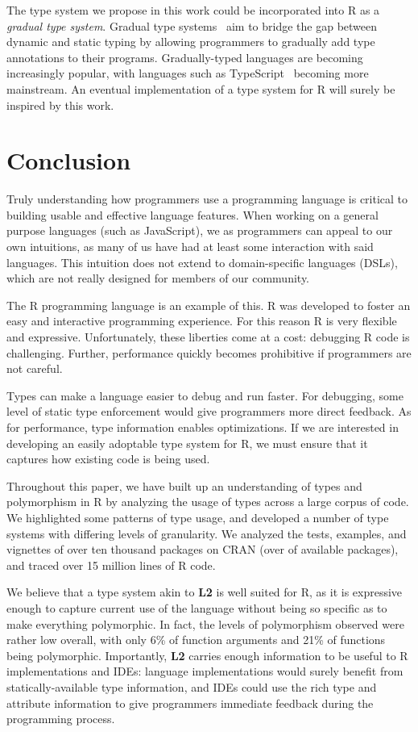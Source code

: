 \documentclass[acmsmall,10pt,review,anonymous]{acmart}\settopmatter{printfolios=true,printccs=false,printacmref=false}
\begin{document}
The type system we propose in this work could be incorporated into R as a {\it gradual type system}.
Gradual type systems~\cite{SiekTaha06} aim to bridge the gap between dynamic and static typing by allowing programmers to gradually add type annotations to their programs.
Gradually-typed languages are becoming increasingly popular, with languages such as TypeScript~\cite{typescript13} becoming more mainstream.
An eventual implementation of a type system for R will surely be inspired by this work.

%
%
%
%
%
\section{Conclusion}

Truly understanding how programmers use a programming language is critical
to building usable and effective language features.  When working on a
general purpose languages (such as JavaScript), we as programmers can appeal
to our own intuitions, as many of us have had at least some interaction with
said languages.  This intuition does not extend to domain-specific languages
(DSLs), which are not really designed for members of our community.  

The R programming language is an example of this.  R was developed to foster
an easy and interactive programming experience. For this reason R is very
flexible and expressive.  Unfortunately, these liberties come at a cost:
debugging R code is challenging. Further, performance quickly becomes
prohibitive if programmers are not careful.

Types can make a language easier to debug and run faster.  For debugging,
some level of static type enforcement would give programmers more direct
feedback.  As for performance, type information enables optimizations. If we
are interested in developing an easily adoptable type system for R, we must
ensure that it captures how existing code is being used.  

Throughout this paper, we have built up an understanding of types and
polymorphism in R by analyzing the usage of types across a large corpus of
code.  We highlighted some patterns of type usage, and developed a number of
type systems with differing levels of granularity. We analyzed the tests,
examples, and vignettes of over ten thousand packages on CRAN (over
\PERCENTCRAN of available packages), and traced over 15 million lines of R
code.

We believe that a type system akin to {\bf L2} is well suited for R, as it
is expressive enough to capture current use of the language without being so
specific as to make everything polymorphic.  In fact, the levels of
polymorphism observed were rather low overall, with only 6\% of function
arguments and 21\% of functions being polymorphic.  Importantly, {\bf L2}
carries enough information to be useful to R implementations and IDEs:
language implementations would surely benefit from statically-available type
information, and IDEs could use the rich type and attribute information to
give programmers immediate feedback during the programming process.

%
%
%


\end{document}
